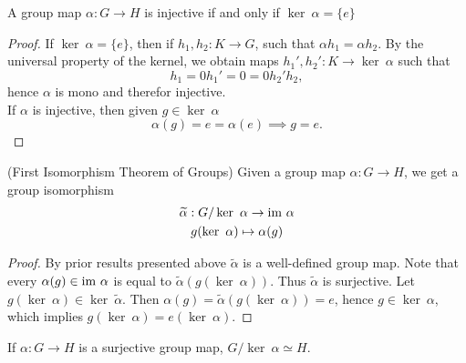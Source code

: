 \begin{lemma}
    A group map $\alpha: G\rightarrow H$ is injective if and only if $\ker\ \alpha = \{e\}$ 
\end{lemma}
\begin{proof}
    If $\ker\ \alpha = \{e\}$, then if $h_1,h_2 : K \rightarrow G$, such that $\alpha h_1 = \alpha h_2$. By the universal property of the kernel, we obtain maps $h_1',h_2' : K\rightarrow \ker \ \alpha$ such that 
    $$
    h_1 =0 h_1'= 0 = 0h_2' h_2,$$ 
    hence $\alpha$ is mono and therefor injective.\\
    If $\alpha$ is injective, then given $g\in \ker \ \alpha$
    $$
        \alpha(g) = e = \alpha(e) \implies g = e.
    $$ 
\end{proof}
\begin{theorem}(First Isomorphism Theorem of Groups)
    Given a group map $\alpha : G\rightarrow H$, we get a group isomorphism 
    \begin{gather*}
        \widetilde{\alpha} : G/\ker \ \alpha \rightarrow \mathrm{im} \ \alpha\\
        g(\ker\ \alpha) \mapsto \alpha(g)
    \end{gather*}
\end{theorem}
\begin{proof}
    By prior results presented above $\widetilde{\alpha}$ is a well-defined group map. Note that every $\alpha(g)\in \mathrm{im} \ \alpha$ is equal to $\widetilde{\alpha}(g(\ker\ \alpha))$. Thus $\widetilde{\alpha}$ is surjective. Let $g(\ker \ \alpha)\in \ker \ \widetilde{\alpha}$. Then $\alpha(g)=\widetilde{\alpha}(g(\ker\ \alpha))=e$, hence $g\in \ker\ \alpha$, which implies $g(\ker \ \alpha) = e(\ker \ \alpha)$.
\end{proof}
\begin{corollary}
    If $\alpha : G\rightarrow H$ is a surjective group map, $G/\ker \ \alpha \simeq H$. 
\end{corollary}

